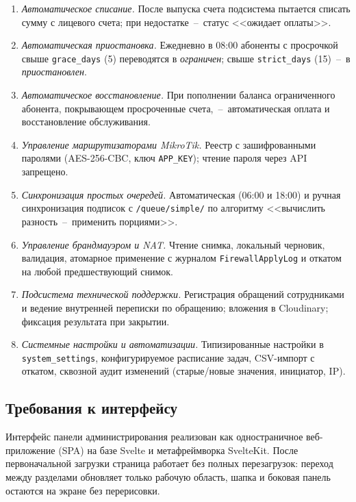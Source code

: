 \begin{enumerate}
\item \emph{Автоматическое списание.} После выпуска счета подсистема пытается списать сумму с лицевого счета; при недостатке~--~статус <<ожидает оплаты>>.

\item \emph{Автоматическая приостановка.} Ежедневно в 08:00 абоненты с просрочкой свыше \texttt{grace\_days} (5) переводятся в \emph{ограничен}; свыше \texttt{strict\_days} (15)~--~в \emph{приостановлен}.

\item \emph{Автоматическое восстановление.} При пополнении баланса ограниченного абонента, покрывающем просроченные счета,~--~автоматическая оплата и восстановление обслуживания.

\item \emph{Управление маршрутизаторами MikroTik.} Реестр с зашифрованными паролями (AES-256-CBC, ключ \texttt{APP\_KEY}); чтение пароля через API запрещено.

\item \emph{Синхронизация простых очередей.} Автоматическая (06:00 и 18:00) и ручная синхронизация подписок с \texttt{/queue/simple/} по алгоритму <<вычислить разность~--~применить порциями>>.

\item \emph{Управление брандмауэром и NAT.} Чтение снимка, локальный черновик, валидация, атомарное применение с журналом \texttt{FirewallApplyLog} и откатом на любой предшествующий снимок.

\item \emph{Подсистема технической поддержки.} Регистрация обращений сотрудниками и ведение внутренней переписки по обращению; вложения в Cloudinary; фиксация результата при закрытии.

\item \emph{Системные настройки и автоматизации.} Типизированные настройки в \texttt{system\_settings}, конфигурируемое расписание задач, CSV-импорт с откатом, сквозной аудит изменений (старые/новые значения, инициатор, IP).
\end{enumerate}

\subsection{Требования к интерфейсу}

Интерфейс панели администрирования реализован как одностраничное веб-приложение (SPA) на базе Svelte и метафреймворка SvelteKit. После первоначальной загрузки страница работает без полных перезагрузок: переход между разделами обновляет только рабочую область, шапка и боковая панель остаются на экране без перерисовки.

